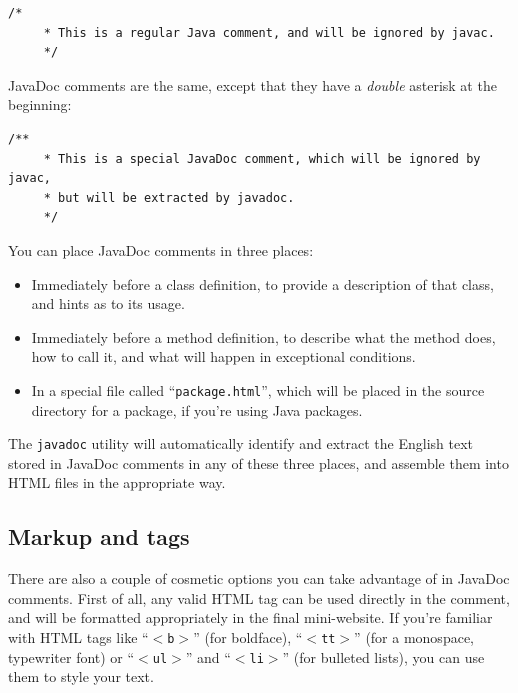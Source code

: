 \vspace{-.2in}
\begin{Verbatim}[fontsize=\footnotesize,samepage=true,frame=none]
    /*
     * This is a regular Java comment, and will be ignored by javac.
     */
\end{Verbatim}

JavaDoc comments are the same, except that they have a \textit{double}
asterisk at the beginning:

\begin{Verbatim}[fontsize=\footnotesize,samepage=true,frame=none]
    /**
     * This is a special JavaDoc comment, which will be ignored by javac,
     * but will be extracted by javadoc.
     */
\end{Verbatim}

You can place JavaDoc comments in three places:

\begin{itemize}
\itemsep.1em

\item Immediately before a class definition, to provide a description of that
class, and hints as to its usage.

\item Immediately before a method definition, to describe what the method
does, how to call it, and what will happen in exceptional conditions.

\item In a special file called ``\texttt{package.html}'', which will be placed
in the source directory for a package, if you're using Java packages.

\end{itemize}

The \texttt{javadoc} utility will automatically identify and extract the
English text stored in JavaDoc comments in any of these three places, and
assemble them into HTML files in the appropriate way.

\subsection{Markup and tags}

There are also a couple of cosmetic options you can take advantage of in
JavaDoc comments. First of all, any valid HTML tag can be used directly in the
comment, and will be formatted appropriately in the final mini-website. If
you're familiar with HTML tags like ``\texttt{$<$b$>$}'' (for boldface),
``\texttt{$<$tt$>$}'' (for a monospace, typewriter font) or
``\texttt{$<$ul$>$}'' and ``\texttt{$<$li$>$}'' (for bulleted lists), you can
use them to style your text.

